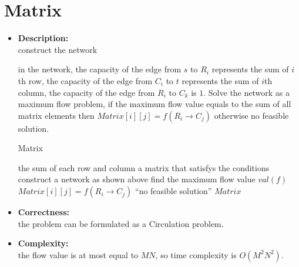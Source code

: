 \section{Matrix}

\begin{itemize}
	\item \textbf{Description:} \\
	 construct the network 
	\begin{center} 
	\end{center} 	 
	in the network, the capacity of the edge from $s$ to $R_i$ represents the sum of $i$th row,
	the capacity of the edge from $C_i$ to $t$ represents the sum of $i$th column, the capacity of
	the edge from $R_i$ to $C_k$ is $1$.
	Solve the network as a maximum flow problem, if the maximum flow value equals to the sum of all
	matrix elements then $Matrix[i][j] = f(R_i \rightarrow C_j)$ otherwise no feasible solution.
		\begin{algorithm}[H]
			\caption{Matrix}
			\begin{algorithmic}[1]
				\Require  the sum of each row and column 
				\Ensure   a matrix that satisfys the conditions
				 {}
	 			  \State construct a network as shown above
	 			  \State find the maximum flow value $val(f)$
		 			  \State $Matrix[i][j] = f(R_i \rightarrow C_j)$
	 			  \Else
		 			  \State \Return ``no feasible solution''
		 		  \EndIf
		 		  \State \Return $Matrix$	  
				\EndFunction 
			\end{algorithmic} 
		\end{algorithm}		
	
	\item \textbf{Correctness:} \\
		 the problem can be formulated as a Circulation problem.
	\item \textbf{Complexity:} \\
		the flow value is at most equal to $MN$, so time complexity is $O(M^2N^2)$.	
\end{itemize} 